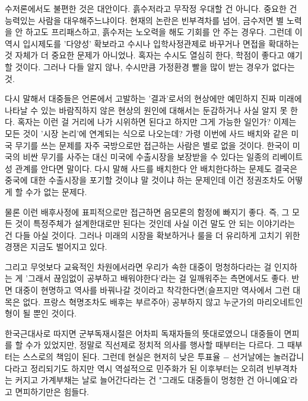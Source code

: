 수저론에서도 불편한 것은 대안이다. 흙수저라고 무작정 우대할 건 아니다. 중요한 건 능력있는 사람을 대우해주느냐이다.
현재의 논란은 빈부격차를 넘어, 금수저면 별 노력을 안 하고도 프리패스하고, 흙수저는 노오력을 해도 기회를 안 주는 경우다.
그런데 이 역시 입시제도를 '다양성' 확보라고 수시나 입학사정관제로 바꾸거나 면접을 확대하는 것 자체가 더 중요한 문제가 아니었나.
혹자는 수시도 열심히 한다, 학점이 좋다고 얘기할 것이다. 그러나 다들 알지 않나,
수시만큼 가정환경 빨을 많이 받는 경우가 없다는 것.
\vspace{5mm}

다시 말해서 대중들은 언론에서 고발하는 '결과'로서의 현상에만 예민하지
진짜 미래에 나타날 수 있는 바람직하지 않은 현상의 원인에 대해서는 둔감하거나 사실 알지 못 한다.
혹자는 이런 걸 거리에 나가 시위하면 된다고 하지만 그게 가능한 일인가? 이제는 모든 것이 '시장 논리'에 연계되는 식으로 나오는데?
가령 이번에 사드 배치와 같은 미국 무기를 쓰는 문제를 자주 국방으로만 접근하는 사람은 별로 없을 것이다.
한국이 미국의 비싼 무기를 사주는 대신 미국에 수출시장을 보장받을 수 있다는 일종의 리베이트성 관계를 안다면 말이다.
다시 말해 사드를 배치한다 안 배치한다하는 문제도 결국은 중국에 대한 수출시장을 포기할 것이냐 말 것이냐 하는 문제인데
이건 정권조차도 어떻게 할 수가 없는 문제다.
\vspace{5mm}

물론 이런 배후사정에 표피적으로만 접근하면 음모론의 함정에 빠지기 좋다.
즉, 그 모든 것이 특정주체가 설계한대로만 된다는 것인데 사실 이건 말도 안 되는 이야기라는 건 다들 아실 것이다.
그러나 미래의 시장을 확보하거나 룰을 더 유리하게 고치기 위한 경쟁은 지금도 벌어지고 있다.
\vspace{5mm}

그리고 무엇보다 교육적인 차원에서라면 우리가 속한 대중이 멍청하다라는 걸 인지하는 게
'그래서 끊임없이 공부하고 배워야한다'라는 걸 일깨워주는 측면에서도 좋다.
반면 대중이 현명하고 역사를 바꿔나갈 것이라고 착각한다면(슬프지만 역사에서 그런 대목은 없다. 프랑스 혁명조차도 배후는 부르주아)
공부하지 않고 누군가의 마리오네트인형이 될 뿐인 것이다.
\vspace{5mm}

한국근대사로 따지면 군부독재시절은 어차피 독재자들의 뜻대로였으니 대중들이 면피를 할 수가 있었지만,
정말로 직선제로 정치적 의사를 행사할 때부터는 다르다. 그 때부터는 스스로의 책임이 된다.
그런데 현실은 현저히 낮은 투표율 $-$ 선거날에는 놀러갑니다라고 정리되기도 하지만
역시 역설적으로 민주화가 된 이후부터는 오히려 빈부격차는 커지고 가계부채는 날로 늘어간다라는 건
"그래도 대중들이 멍청한 건 아니예요'라고 면피하기만은 힘들다.
\vspace{5mm}


